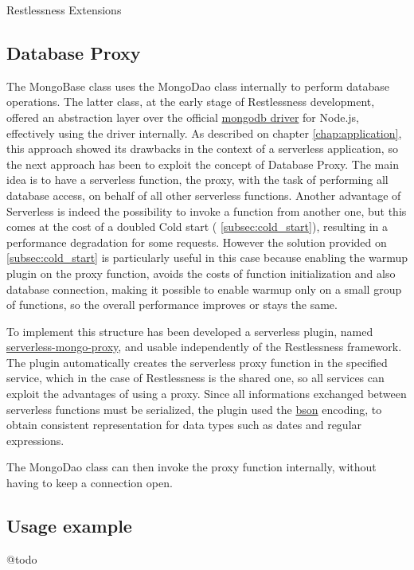 \begin{chapter}{Restlessness Extensions}
    \subsection{Database Proxy}
    \label{subsec:database_proxy}
    The MongoBase class uses the MongoDao class internally to perform database
    operations. The latter class, at the early stage of Restlessness development,
    offered an abstraction layer over the official
    \href{https://www.npmjs.com/package/mongodb}{mongodb driver} for Node.js,
    effectively using the driver internally.
    As described on chapter \ref{chap:application}, this approach showed its
    drawbacks in the context of a serverless application, so the next approach has
    been to exploit the concept of Database Proxy.
    The main idea is to have a serverless function, the proxy, with the task of
    performing all database access, on behalf of all other serverless functions.
    Another advantage of Serverless is indeed the possibility to invoke a function
    from another one, but this comes at the cost of a doubled Cold start (
    \ref{subsec:cold_start}), resulting in a performance degradation for some requests.
    However the solution provided on \ref{subsec:cold_start} is particularly useful in
    this case because enabling the warmup plugin on the proxy function, avoids the
    costs of function initialization and also database connection, making it possible
    to enable warmup only on a small group of functions, so the overall performance
    improves or stays the same.

    To implement this structure has been developed a serverless plugin, named
    \href{https://www.npmjs.com/package/serverless-mongo-proxy}{serverless-mongo-proxy},
    and usable independently of the Restlessness framework.
    The plugin automatically creates the serverless proxy function in the specified
    service, which in the case of Restlessness is the shared one, so all services
    can exploit the advantages of using a proxy.
    Since all informations exchanged between serverless functions must be serialized,
    the plugin used the \href{http://bsonspec.org/}{bson} encoding, to obtain consistent
    representation for data types such as dates and regular expressions.

    The MongoDao class can then invoke the proxy function internally, without having
    to keep a connection open.

    \subsection{Usage example}
    @todo

\end{chapter}